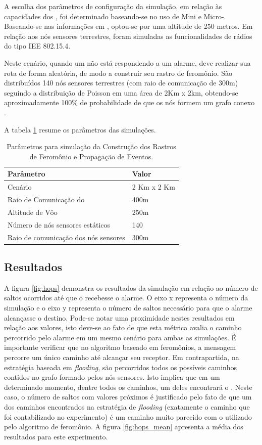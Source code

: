 A escolha dos parâmetros de configuração da simulação, em relação às capacidades dos \vants, foi determinado baseando-se no uso de Mini e Micro-\vants. Baseando-se nas informações em \cite{uas_2009,Storvold2009}, optou-se por uma altitude de 250 metros. Em relação aos nós sensores terrestres, foram simuladas as funcionalidades de rádios do tipo IEE 802.15.4.

Neste cenário, quando um \vant não está respondendo a um alarme, deve realizar sua rota de forma aleatória, de modo a construir seu rastro de feromônio. São distribuídos 140 nós sensores terrestres (com raio de comunicação de 300m) seguindo a distribuição de Poisson em uma área de 2Km x 2km, obtendo-se aproximadamente 100\% de probabilidade de que os nós formem um grafo conexo \cite{Bettstetter2002}.

A tabela \ref{tbl:setup} resume os parâmetros das simulações.

\begin{table}[h!]
\centering
	\begin{tabular}{| l | l |}
		\hline
		Parâmetro & Valor \\
		\hline
		Cenário & 2 Km x 2 Km\\
		Raio de Comunicação do \vant & 400m\\
		Altitude de Vôo & 250m  \\
		Número de nós sensores estáticos & 140  \\
		Raio de comunicação dos nós sensores & 300m \\
		\hline
	\end{tabular}

	\caption{Parâmetros para simulação da Construção dos Rastros de Feromônio e Propagação de Eventos.}
	\label{tbl:setup}
\end{table}


\subsection{Resultados}

 A figura \ref{fig:hops} demonstra os resultados da simulação em relação ao número de saltos ocorridos até que o \vant recebesse o alarme. O eixo x representa o número da simulação e o eixo y representa o número de saltos necessário para que o alarme alcançasse o destino. Pode-se notar uma proximidade nestes resultados em relação aos valores, isto deve-se ao fato de que esta métrica avalia o caminho percorrido pelo alarme em um mesmo cenário para ambas as simulações. É importante verificar que no algoritmo baseado em feromônios, a mensagem percorre um único caminho até alcançar seu receptor. Em contrapartida, na estratégia baseada em \emph{flooding}, são percorridos todos os possíveis caminhos contidos no grafo formado pelos nós sensores. Isto implica que em um determinado momento, dentre todos os caminhos, um deles encontrará o \vant. Neste caso, o número de saltos com valores próximos é justificado pelo fato de que um dos caminhos encontrados na estratégia de \emph{flooding} (exatamente o caminho que foi contabilizado no experimento) é um caminho muito parecido com o utilizado pelo algoritmo de feromônio. A figura \ref{fig:hops_mean} apresenta a média dos resultados para este experimento.


